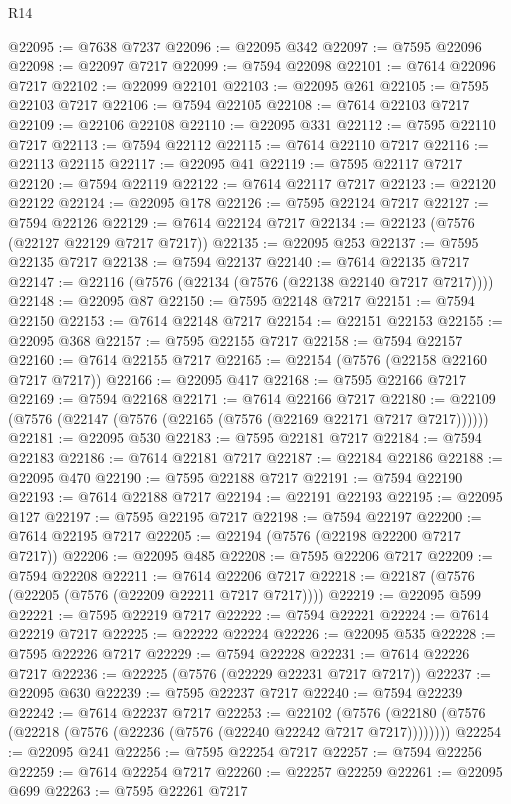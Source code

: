 \begin{lexlean}{R14}
\begin{coremodule}
@22095 := @7638 @7237
@22096 := @22095 @342
@22097 := @7595 @22096
@22098 := @22097 @7217
@22099 := @7594 @22098
@22101 := @7614 @22096 @7217
@22102 := @22099 @22101
@22103 := @22095 @261
@22105 := @7595 @22103 @7217
@22106 := @7594 @22105
@22108 := @7614 @22103 @7217
@22109 := @22106 @22108
@22110 := @22095 @331
@22112 := @7595 @22110 @7217
@22113 := @7594 @22112
@22115 := @7614 @22110 @7217
@22116 := @22113 @22115
@22117 := @22095 @41
@22119 := @7595 @22117 @7217
@22120 := @7594 @22119
@22122 := @7614 @22117 @7217
@22123 := @22120 @22122
@22124 := @22095 @178
@22126 := @7595 @22124 @7217
@22127 := @7594 @22126
@22129 := @7614 @22124 @7217
@22134 := @22123 (@7576 (@22127 @22129 @7217 @7217))
@22135 := @22095 @253
@22137 := @7595 @22135 @7217
@22138 := @7594 @22137
@22140 := @7614 @22135 @7217
@22147 := @22116 (@7576 (@22134 (@7576 (@22138 @22140 @7217 @7217))))
@22148 := @22095 @87
@22150 := @7595 @22148 @7217
@22151 := @7594 @22150
@22153 := @7614 @22148 @7217
@22154 := @22151 @22153
@22155 := @22095 @368
@22157 := @7595 @22155 @7217
@22158 := @7594 @22157
@22160 := @7614 @22155 @7217
@22165 := @22154 (@7576 (@22158 @22160 @7217 @7217))
@22166 := @22095 @417
@22168 := @7595 @22166 @7217
@22169 := @7594 @22168
@22171 := @7614 @22166 @7217
@22180 := @22109 (@7576 (@22147 (@7576 (@22165 (@7576 (@22169 @22171 @7217 @7217))))))
@22181 := @22095 @530
@22183 := @7595 @22181 @7217
@22184 := @7594 @22183
@22186 := @7614 @22181 @7217
@22187 := @22184 @22186
@22188 := @22095 @470
@22190 := @7595 @22188 @7217
@22191 := @7594 @22190
@22193 := @7614 @22188 @7217
@22194 := @22191 @22193
@22195 := @22095 @127
@22197 := @7595 @22195 @7217
@22198 := @7594 @22197
@22200 := @7614 @22195 @7217
@22205 := @22194 (@7576 (@22198 @22200 @7217 @7217))
@22206 := @22095 @485
@22208 := @7595 @22206 @7217
@22209 := @7594 @22208
@22211 := @7614 @22206 @7217
@22218 := @22187 (@7576 (@22205 (@7576 (@22209 @22211 @7217 @7217))))
@22219 := @22095 @599
@22221 := @7595 @22219 @7217
@22222 := @7594 @22221
@22224 := @7614 @22219 @7217
@22225 := @22222 @22224
@22226 := @22095 @535
@22228 := @7595 @22226 @7217
@22229 := @7594 @22228
@22231 := @7614 @22226 @7217
@22236 := @22225 (@7576 (@22229 @22231 @7217 @7217))
@22237 := @22095 @630
@22239 := @7595 @22237 @7217
@22240 := @7594 @22239
@22242 := @7614 @22237 @7217
@22253 := @22102
    (@7576 (@22180 (@7576 (@22218 (@7576 (@22236 (@7576 (@22240 @22242 @7217 @7217))))))))
@22254 := @22095 @241
@22256 := @7595 @22254 @7217
@22257 := @7594 @22256
@22259 := @7614 @22254 @7217
@22260 := @22257 @22259
@22261 := @22095 @699
@22263 := @7595 @22261 @7217

\end{coremodule}
\end{lexlean}
